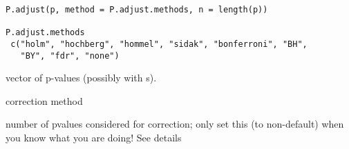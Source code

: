 \documentclass[a4paper]{book}
\begin{document}
%
\begin{Usage}
\begin{verbatim}
P.adjust(p, method = P.adjust.methods, n = length(p))

P.adjust.methods
 c("holm", "hochberg", "hommel", "sidak", "bonferroni", "BH",
   "BY", "fdr", "none")
\end{verbatim}
\end{Usage}
%
\begin{Arguments}
\begin{ldescription}
\item[\code{p}] vector of p-values (possibly with s).
\item[\code{method}] correction method
\item[\code{n}] number of pvalues considered for correction;
only set this (to non-default) when you know what you are doing! See details
\end{ldescription}
\end{Arguments}
%
\end{document}
